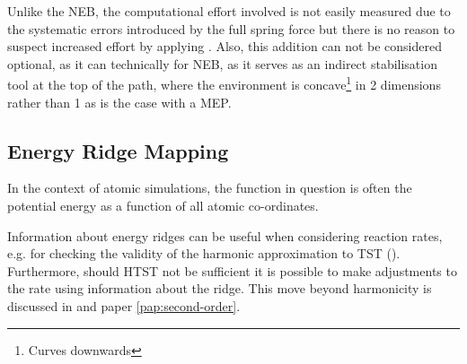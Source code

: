 Unlike the NEB, the computational effort involved is not easily measured due to the systematic errors introduced by the full spring force but there is no reason to suspect increased effort by applying .
Also, this addition can not be considered optional, as it can technically for NEB, as it serves as an indirect stabilisation tool at the top of the path, where the environment is concave\footnote{Curves downwards} in 2 dimensions rather than 1 as is the case with a MEP.

\subsection{Energy Ridge Mapping}
\label{sec:energy-ridge-mapping}
In the context of atomic simulations, the function in question is often the potential energy as a function of all atomic co-ordinates.

Information about energy ridges can be useful when considering reaction rates, e.g. for checking the validity of the harmonic approximation to TST ().
Furthermore, should HTST not be sufficient it is possible to make adjustments to the rate using information about the ridge.
This move beyond harmonicity is discussed in  and paper \ref{pap:second-order}.
